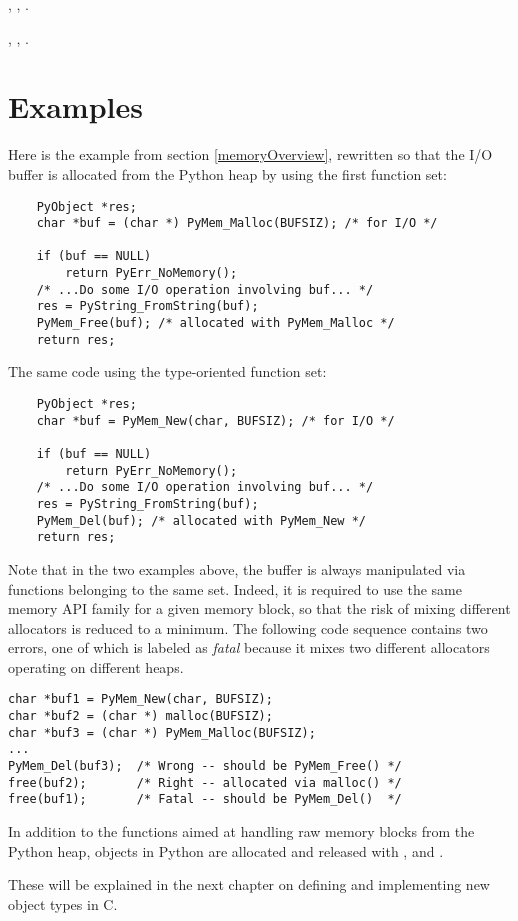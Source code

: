 , , .

, , .


\section{Examples \label{memoryExamples}}

Here is the example from section \ref{memoryOverview}, rewritten so
that the I/O buffer is allocated from the Python heap by using the
first function set:

\begin{verbatim}
    PyObject *res;
    char *buf = (char *) PyMem_Malloc(BUFSIZ); /* for I/O */

    if (buf == NULL)
        return PyErr_NoMemory();
    /* ...Do some I/O operation involving buf... */
    res = PyString_FromString(buf);
    PyMem_Free(buf); /* allocated with PyMem_Malloc */
    return res;
\end{verbatim}

The same code using the type-oriented function set:

\begin{verbatim}
    PyObject *res;
    char *buf = PyMem_New(char, BUFSIZ); /* for I/O */

    if (buf == NULL)
        return PyErr_NoMemory();
    /* ...Do some I/O operation involving buf... */
    res = PyString_FromString(buf);
    PyMem_Del(buf); /* allocated with PyMem_New */
    return res;
\end{verbatim}

Note that in the two examples above, the buffer is always
manipulated via functions belonging to the same set. Indeed, it
is required to use the same memory API family for a given
memory block, so that the risk of mixing different allocators is
reduced to a minimum. The following code sequence contains two errors,
one of which is labeled as \emph{fatal} because it mixes two different
allocators operating on different heaps.

\begin{verbatim}
char *buf1 = PyMem_New(char, BUFSIZ);
char *buf2 = (char *) malloc(BUFSIZ);
char *buf3 = (char *) PyMem_Malloc(BUFSIZ);
...
PyMem_Del(buf3);  /* Wrong -- should be PyMem_Free() */
free(buf2);       /* Right -- allocated via malloc() */
free(buf1);       /* Fatal -- should be PyMem_Del()  */
\end{verbatim}

In addition to the functions aimed at handling raw memory blocks from
the Python heap, objects in Python are allocated and released with
,  and
.

These will be explained in the next chapter on defining and
implementing new object types in C.
